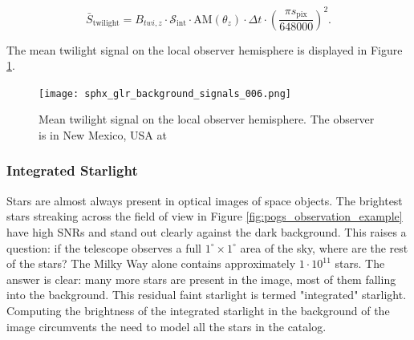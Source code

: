 \begin{equation} \label{eq:twilight_adu}
  \bar{S}_\mathrm{twilight} = B_{twi,z} \cdot \mathcal{S}_\mathrm{int} \cdot \textrm{AM}(\theta_z) \cdot \Delta t \cdot \left( \frac{\pi s_\mathrm{pix}}{648000} \right)^2.
\end{equation}

The mean twilight signal on the local observer hemisphere is displayed in Figure \ref{fig:twilight_hemi}.

\begin{figure}[ht]
  \centering
  \texttt{[image: sphx\_glr\_background\_signals\_006.png]}
  \caption{Mean twilight signal on the local observer hemisphere. The observer is in New Mexico, USA at
  \pogslla}
  \label{fig:twilight_hemi}
\end{figure}

\subsubsection{Integrated Starlight}

Stars are almost always present in optical images of space objects. The brightest stars streaking across the field of view in Figure \ref{fig:pogs_observation_example} have high SNRs and stand out clearly against the dark background. This raises a question: if the telescope observes a full $1^\circ \times 1^\circ$ area of the sky, where are the rest of the stars? The Milky Way alone contains approximately $1\cdot10^{11}$ stars. The answer is clear: many more stars are present in the image, most of them falling into the background. This residual faint starlight is termed "integrated" starlight. Computing the brightness of the integrated starlight in the background of the image circumvents the need to model all the stars in the catalog.

